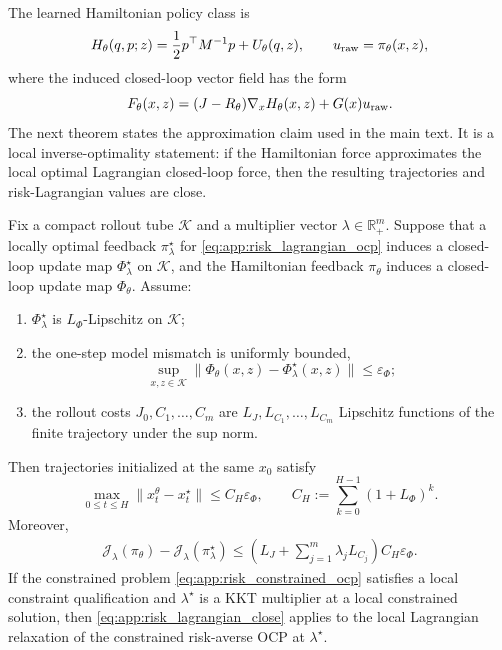 The learned Hamiltonian policy class is
\begin{equation}
    H_\theta(q,p;z)
    =
    \frac12p^\top M^{-1}p
    +U_\theta(q,z),
    \qquad
    u_{\rm raw}=\pi_\theta(x,z),
    \label{eq:app:hamiltonian_policy_class}
\end{equation}
where the induced closed-loop vector field has the form
\begin{equation}
    F_\theta(x,z)
    =
    (J-R_\theta)\nabla_xH_\theta(x,z)+G(x)u_{\rm raw}.
\end{equation}
The next theorem states the approximation claim used in the main text. It is a local
inverse-optimality statement: if the Hamiltonian force approximates the local optimal
Lagrangian closed-loop force, then the resulting trajectories and risk-Lagrangian
values are close.

\begin{theorem}
\label{thm:hamiltonian_approx_risk_ocp}
Fix a compact rollout tube $\mathcal K$ and a multiplier vector
$\lambda\in\mathbb R_+^m$. Suppose that a locally optimal feedback
$\pi_\lambda^\star$ for \eqref{eq:app:risk_lagrangian_ocp} induces a closed-loop update
map $\Phi_\lambda^\star$ on $\mathcal K$, and the Hamiltonian feedback
$\pi_\theta$ induces a closed-loop update map $\Phi_\theta$. Assume:
\begin{enumerate}
    \item $\Phi_\lambda^\star$ is $L_\Phi$-Lipschitz on $\mathcal K$;
    \item the one-step model mismatch is uniformly bounded,
    \begin{equation}
        \sup_{x,z\in\mathcal K}
        \|\Phi_\theta(x,z)-\Phi_\lambda^\star(x,z)\|
        \le \varepsilon_\Phi ;
        \label{eq:app:one_step_phi_mismatch}
    \end{equation}
    \item the rollout costs $J_0,C_1,\dots,C_m$ are $L_J,L_{C_1},\dots,L_{C_m}$
    Lipschitz functions of the finite trajectory under the sup norm.
\end{enumerate}
Then trajectories initialized at the same $x_0$ satisfy
\begin{equation}
    \max_{0\le t\le H}\|x_t^\theta-x_t^\star\|
    \le
    C_H\varepsilon_\Phi,
    \qquad
    C_H:=\sum_{k=0}^{H-1}(1+L_\Phi)^k .
    \label{eq:app:ocp_traj_close}
\end{equation}
Moreover,
\begin{equation}
\begin{aligned}
    \mathcal J_\lambda(\pi_\theta)-\mathcal J_\lambda(\pi_\lambda^\star)
    \le
    \left(L_J+\sum_{j=1}^m\lambda_jL_{C_j}\right)
    C_H\varepsilon_\Phi .
\end{aligned}
\label{eq:app:risk_lagrangian_close}
\end{equation}
If the constrained problem \eqref{eq:app:risk_constrained_ocp} satisfies a local
constraint qualification and $\lambda^\star$ is a KKT multiplier at a local constrained
solution, then \eqref{eq:app:risk_lagrangian_close} applies to the local Lagrangian
relaxation of the constrained risk-averse OCP at $\lambda^\star$.
\end{theorem}

